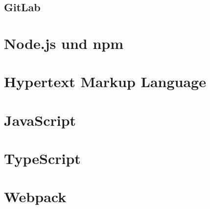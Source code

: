 \subsection{GitLab}

\section{Node.js und npm}

\section{Hypertext Markup Language}

\section{JavaScript}

\section{TypeScript}

\section{Webpack}